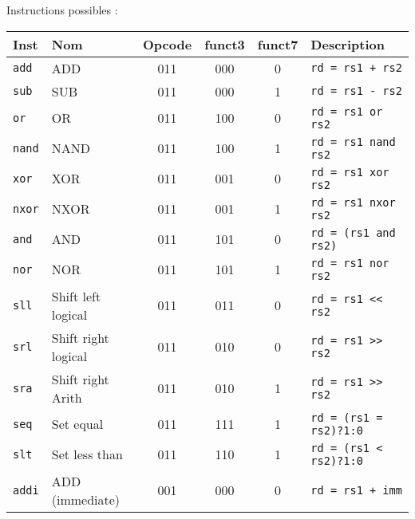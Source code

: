 \documentclass[a4paper]{article}
\begin{document}
    Instructions possibles :

    \begin{longtable}{|l|l|c|c|c|l|}
        \hline
        Inst           & Nom                             & Opcode & funct3 & funct7 & Description                   \\
        \hline

        \texttt{add}   & ADD                             & 011    & 000    & 0      & \texttt{rd = rs1 + rs2}       \\
        \texttt{sub}   & SUB                             & 011    & 000    & 1      & \texttt{rd = rs1 - rs2}       \\
        \texttt{or}    & OR                              & 011    & 100    & 0      & \texttt{rd = rs1 or rs2}      \\
        \texttt{nand}  & NAND                            & 011    & 100    & 1      & \texttt{rd = rs1 nand rs2}    \\
        \texttt{xor}   & XOR                             & 011    & 001    & 0      & \texttt{rd = rs1 xor rs2}     \\
        \texttt{nxor}  & NXOR                            & 011    & 001    & 1      & \texttt{rd = rs1 nxor rs2}    \\
        \texttt{and}   & AND                             & 011    & 101    & 0      & \texttt{rd = (rs1 and rs2)}   \\
        \texttt{nor}   & NOR                             & 011    & 101    & 1      & \texttt{rd = rs1 nor rs2}     \\
        \texttt{sll}   & Shift left logical              & 011    & 011    & 0      & \texttt{rd = rs1 << rs2}      \\
        \texttt{srl}   & Shift right logical             & 011    & 010    & 0      & \texttt{rd = rs1 >> rs2}      \\
        \texttt{sra}   & Shift right Arith               & 011    & 010    & 1      & \texttt{rd = rs1 >> rs2}      \\
        \texttt{seq}   & Set equal                       & 011    & 111    & 1      & \texttt{rd = (rs1 = rs2)?1:0} \\
        \texttt{slt}   & Set less than                   & 011    & 110    & 1      & \texttt{rd = (rs1 < rs2)?1:0} \\
        \hline
        \texttt{addi}  & ADD (immediate)                 & 001    & 000    & 0      & \texttt{rd = rs1 + imm}       \\

\end{longtable}
\end{document}
